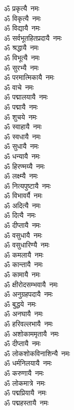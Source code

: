 \begin{multicols}{2}
\begin{flushleft}
ॐ प्रकृत्यै~नमः\\
ॐ विकृत्यै~नमः\\
ॐ विद्यायै~नमः\\
ॐ सर्वभूतहितप्रदायै~नमः\\
ॐ श्रद्धायै~नमः\\
ॐ विभूत्यै~नमः\\
ॐ सुरभ्यै~नमः\\
ॐ परमात्मिकायै~नमः\\
ॐ वाचे~नमः\\
ॐ पद्मालयायै~नमः\hfill{}\\
ॐ पद्मायै~नमः\\
ॐ शुचये~नमः\\
ॐ स्वाहायै~नमः\\
ॐ स्वधायै~नमः\\
ॐ सुधायै~नमः\\
ॐ धन्यायै~नमः\\
ॐ हिरण्मय्यै~नमः\\
ॐ लक्ष्म्यै~नमः\\
ॐ नित्यपुष्टायै~नमः\\
ॐ विभावर्यै~नमः\hfill{}\\
ॐ अदित्यै~नमः\\
ॐ दित्यै~नमः\\
ॐ दीप्तायै~नमः\\
ॐ वसुधायै~नमः\\
ॐ वसुधारिण्यै~नमः\\
ॐ कमलायै~नमः\\
ॐ कान्तायै~नमः\\
ॐ कामायै~नमः\\
ॐ क्षीरोदसम्भवायै~नमः\\
ॐ अनुग्रहपदायै~नमः\hfill{}\\
ॐ बुद्धये~नमः\\
ॐ अनघायै~नमः\\
ॐ हरिवल्लभायै~नमः\\
ॐ अशोकाममृतायै~नमः\\
ॐ दीप्तायै~नमः\\
ॐ लोकशोकविनाशिन्यै~नमः\\
ॐ धर्मनिलयायै~नमः\\
ॐ करुणायै~नमः\\
ॐ लोकमात्रे~नमः\\
ॐ पद्मप्रियायै~नमः\hfill{}\\
ॐ पद्महस्तायै~नमः\\

\end{flushleft}
\end{multicols}
